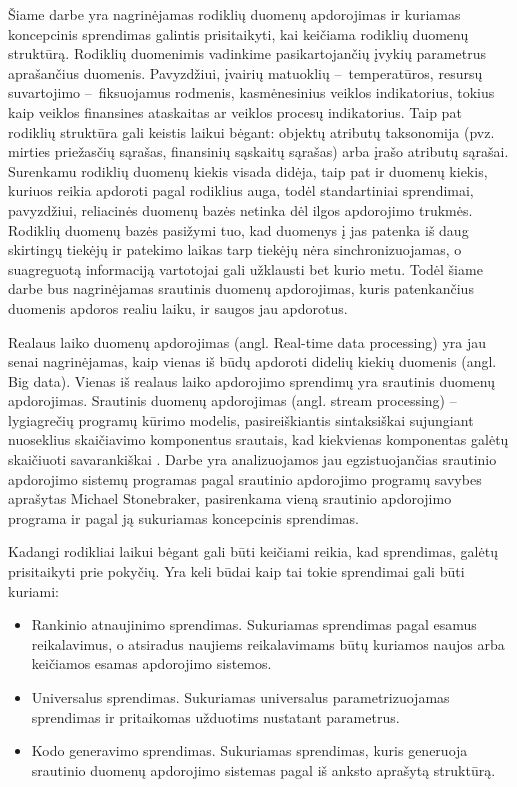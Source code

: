 \documentclass{VUMIFPSbakalaurinis}
\begin{document}
\tableofcontents

 
Šiame darbe yra nagrinėjamas rodiklių duomenų apdorojimas ir kuriamas koncepcinis sprendimas galintis prisitaikyti, kai keičiama rodiklių duomenų struktūrą. Rodiklių duomenimis vadinkime pasikartojančių įvykių parametrus aprašančius duomenis. Pavyzdžiui, įvairių matuoklių – temperatūros, resursų suvartojimo – fiksuojamus rodmenis, kasmėnesinius veiklos indikatorius, tokius kaip veiklos finansines ataskaitas ar veiklos procesų indikatorius. Taip pat rodiklių struktūra gali keistis laikui bėgant: objektų atributų taksonomija (pvz. mirties priežasčių sąrašas, finansinių sąskaitų sąrašas) arba įrašo atributų sąrašai. Surenkamu rodiklių duomenų kiekis visada didėja, taip pat ir duomenų kiekis, kuriuos reikia apdoroti pagal rodiklius auga, todėl standartiniai sprendimai, pavyzdžiui, reliacinės duomenų bazės netinka dėl ilgos apdorojimo trukmės. Rodiklių duomenų bazės pasižymi tuo, kad duomenys į jas patenka iš daug skirtingų tiekėjų ir patekimo laikas tarp tiekėjų nėra sinchronizuojamas, o suagreguotą informaciją vartotojai gali užklausti bet kurio metu. Todėl šiame darbe bus nagrinėjamas srautinis duomenų apdorojimas, kuris patenkančius duomenis apdoros realiu laiku, ir saugos jau apdorotus. \par
Realaus laiko duomenų apdorojimas (angl. Real-time data processing) yra jau senai nagrinėjamas, kaip vienas iš būdų apdoroti didelių kiekių duomenis (angl. Big data). Vienas iš realaus laiko apdorojimo sprendimų yra srautinis duomenų apdorojimas. Srautinis duomenų apdorojimas (angl. stream processing) – lygiagrečių programų kūrimo modelis, pasireiškiantis sintaksiškai sujungiant nuoseklius skaičiavimo komponentus srautais, kad kiekvienas komponentas galėtų skaičiuoti savarankiškai \cite{shortstreamproc}. Darbe yra analizuojamos jau egzistuojančias srautinio apdorojimo sistemų programas pagal srautinio apdorojimo programų savybes aprašytas Michael Stonebraker, pasirenkama vieną srautinio apdorojimo programa ir pagal ją sukuriamas koncepcinis sprendimas. 
\par
Kadangi rodikliai laikui bėgant gali būti keičiami reikia, kad sprendimas, galėtų prisitaikyti prie pokyčių. Yra keli būdai kaip tai tokie sprendimai gali būti kuriami:
\begin{itemize}
    \item Rankinio atnaujinimo sprendimas. Sukuriamas sprendimas pagal esamus reikalavimus, o atsiradus naujiems reikalavimams būtų kuriamos naujos arba keičiamos esamas apdorojimo sistemos. 
    \item Universalus sprendimas. Sukuriamas universalus parametrizuojamas sprendimas ir pritaikomas užduotims nustatant parametrus.
    \item Kodo generavimo sprendimas. Sukuriamas sprendimas, kuris generuoja srautinio duomenų apdorojimo sistemas pagal iš anksto aprašytą struktūrą.  
\end{itemize}   
\end{document}
